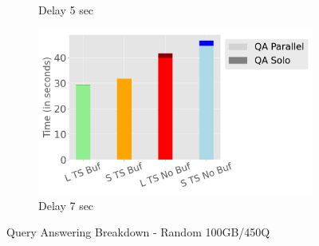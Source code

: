 \begin{figure}
\begin{subfigure}[c]{0.48\textwidth}
		\caption{Delay 5 sec}
		\label{fig:query-answering-breakdown-5}
	\end{subfigure}
	\begin{subfigure}[c]{0.48\textwidth}
		\includegraphics[width=1\textwidth]   {figures/Experiments/Dynamic/Breakdown/dataset_104857600_lockfree_Messi_Results_query_answering_breakdown_10485760_7.png}
		\caption{Delay 7 sec}
		\label{fig:query-answering-breakdown-7}
	\end{subfigure}
	\caption{Query Answering Breakdown - Random 100GB/450Q}
	\label{query-answering-breakdown-random}
\end{figure}

\clearpage
